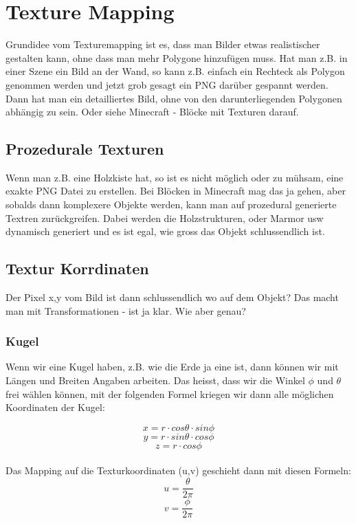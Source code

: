 \chapter{Texture Mapping}
Grundidee vom Texturemapping ist es, dass man Bilder etwas realistischer gestalten kann, ohne dass man mehr Polygone hinzufügen muss. Hat man z.B. in einer Szene ein Bild an der Wand, so kann z.B. einfach ein Rechteck als Polygon genommen werden und jetzt grob gesagt ein PNG darüber gespannt werden. Dann hat man ein detailliertes Bild, ohne von den darunterliegenden Polygonen abhängig zu sein. Oder siehe Minecraft - Blöcke mit Texturen darauf.

\section{Prozedurale Texturen}
Wenn man z.B. eine Holzkiste hat, so ist es nicht möglich oder zu mühsam, eine exakte PNG Datei zu erstellen. Bei Blöcken in Minecraft mag das ja gehen, aber sobalds dann komplexere Objekte werden, kann man auf prozedural generierte Textren zurückgreifen. Dabei werden die Holzstrukturen, oder Marmor usw dynamisch generiert und es ist egal, wie gross das Objekt schlussendlich ist.

\section{Textur Korrdinaten}
Der Pixel x,y vom Bild ist dann schlussendlich wo auf dem Objekt? Das macht man mit Transformationen - ist ja klar. Wie aber genau?
\subsection{Kugel}
Wenn wir eine Kugel haben, z.B. wie die Erde ja eine ist, dann können wir mit Längen und Breiten Angaben arbeiten. Das heisst, dass wir die Winkel \(\phi\) und \(\theta\) frei wählen können, mit der folgenden Formel kriegen wir dann alle möglichen Koordinaten der Kugel:

\begin{displaymath}
x = r\cdot cos \theta \cdot  sin \phi
\end{displaymath}
\begin{displaymath}
y = r\cdot sin \theta \cdot  cos \phi
\end{displaymath}
\begin{displaymath}
z = r\cdot cos\phi
\end{displaymath}\\
Das Mapping auf die Texturkoordinaten (u,v) geschieht dann mit diesen Formeln:
\begin{displaymath}
u = \frac{\theta}{2\pi}
\end{displaymath}
\begin{displaymath}
v = \frac{\phi}{2\pi}
\end{displaymath}
